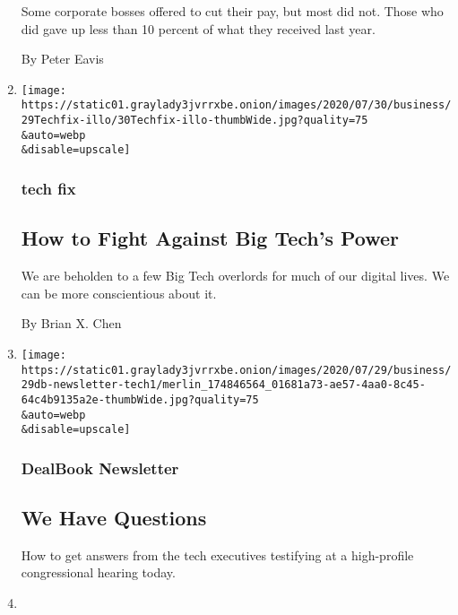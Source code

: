 \begin{enumerate}
  Some corporate bosses offered to cut their pay, but most did not.
  Those who did gave up less than 10 percent of what they received last
  year.

  By Peter Eavis
\item
  \href{/2020/07/29/technology/personaltech/big-tech-power-how-to-fight.html}{}

  \texttt{[image: https://static01.graylady3jvrrxbe.onion/images/2020/07/30/business/29Techfix-illo/30Techfix-illo-thumbWide.jpg?quality=75\\\&auto=webp\\\&disable=upscale]}

  \hypertarget{tech-fix}{%
  \subsubsection{tech fix}\label{tech-fix}}

  \hypertarget{how-to-fight-against-big-techs-power}{%
  \subsection{How to Fight Against Big Tech's
  Power}\label{how-to-fight-against-big-techs-power}}

  We are beholden to a few Big Tech overlords for much of our digital
  lives. We can be more conscientious about it.

  By Brian X. Chen
\item
  \href{/2020/07/29/business/dealbook/tech-congress-hearing-questions.html}{}

  \texttt{[image: https://static01.graylady3jvrrxbe.onion/images/2020/07/29/business/29db-newsletter-tech1/merlin\_174846564\_01681a73-ae57-4aa0-8c45-64c4b9135a2e-thumbWide.jpg?quality=75\\\&auto=webp\\\&disable=upscale]}

  \hypertarget{dealbook-newsletter}{%
  \subsubsection{DealBook Newsletter}\label{dealbook-newsletter}}

  \hypertarget{we-have-questions}{%
  \subsection{We Have Questions}\label{we-have-questions}}

  How to get answers from the tech executives testifying at a
  high-profile congressional hearing today.
\item
  \href{/2020/07/29/world/europe/turkey-social-media-control.html}{}


\end{enumerate}
